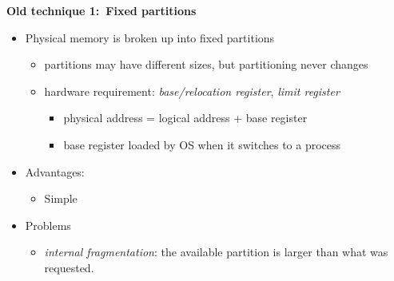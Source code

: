 \documentclass[11pt,a4paper]{article}
\begin{document}
\textbf{Old technique 1:\ Fixed partitions}
\begin{itemize}
    \item Physical memory is broken up into fixed partitions
        \begin{itemize}
            \item partitions may have different sizes, but partitioning never changes
            \item hardware requirement: \emph{base/relocation register},
                \emph{limit register}
                \begin{itemize}
                    \item physical address = logical address + base register
                    \item base register loaded by OS when it switches to a process
                \end{itemize}
        \end{itemize}
    \item Advantages:
        \begin{itemize}
            \item Simple
        \end{itemize}
    \item Problems
        \begin{itemize}
            \item \emph{internal fragmentation}: the available partition is larger than what
                was requested.
        \end{itemize}
\end{itemize}
\end{document}
